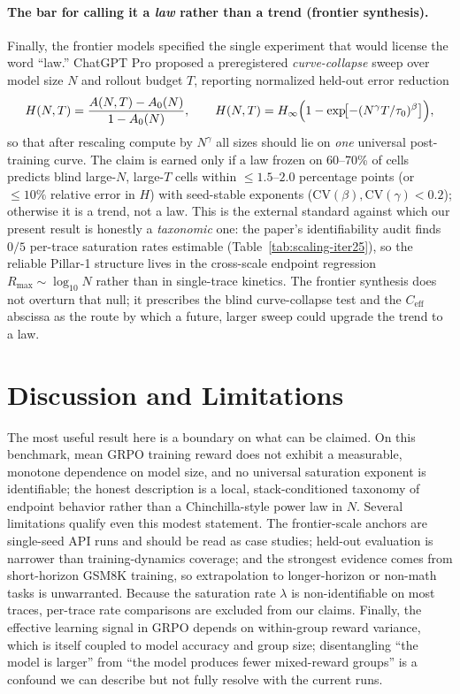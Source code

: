 \documentclass{article}
\providecommand{\tableref}[1]{Table~\ref{#1}}
\begin{document}
\paragraph{The bar for calling it a \emph{law} rather than a trend (frontier synthesis).}
Finally, the frontier models specified the single experiment that would
license the word ``law.'' ChatGPT Pro proposed a preregistered
\emph{curve-collapse} sweep over model size $N$ and rollout budget $T$,
reporting normalized held-out error reduction
\begin{equation}
  \label{eq:frontier-collapse}
  H(N,T) = \frac{A(N,T) - A_0(N)}{1 - A_0(N)},
  \qquad
  H(N,T) = H_\infty\Bigl(1 - \exp\!\bigl[-(N^{\gamma} T / \tau_0)^{\beta}\bigr]\Bigr),
\end{equation}
so that after rescaling compute by $N^{\gamma}$ all sizes should lie on
\emph{one} universal post-training curve. The claim is earned only if a law
frozen on 60--70\% of cells predicts blind large-$N$, large-$T$ cells within
$\le 1.5$--$2.0$ percentage points (or $\le 10\%$ relative error in $H$) with
seed-stable exponents ($\mathrm{CV}(\beta),\mathrm{CV}(\gamma)<0.2$);
otherwise it is a trend, not a law. This is the external standard against
which our present result is honestly a \emph{taxonomic} one: the paper's
identifiability audit finds $0/5$ per-trace saturation rates estimable
(\tableref{tab:scaling-iter25}), so the reliable Pillar-1 structure lives in
the cross-scale endpoint regression $R_{\max}\sim\log_{10}N$ rather than in
single-trace kinetics. The frontier synthesis does not overturn that null; it
prescribes the blind curve-collapse test and the $C_{\mathrm{eff}}$ abscissa
as the route by which a future, larger sweep could upgrade the trend to a law.
 \section{Discussion and Limitations}
\label{sec:p1-discussion}
The most useful result here is a boundary on what can be claimed. On this
benchmark, mean GRPO training reward does not exhibit a measurable, monotone dependence
on model size, and no universal saturation exponent is identifiable; the honest
description is a local, stack-conditioned taxonomy of endpoint behavior rather than a
Chinchilla-style power law in $N$. Several limitations qualify even this modest
statement. The frontier-scale anchors are single-seed API runs and should be read
as case studies; held-out evaluation is narrower than training-dynamics coverage;
and the strongest evidence comes from short-horizon GSM8K training, so extrapolation
to longer-horizon or non-math tasks is unwarranted. Because the saturation rate
$\lambda$ is non-identifiable on most traces, per-trace rate comparisons are
excluded from our claims. Finally, the effective learning signal in GRPO depends
on within-group reward variance, which is itself coupled to model accuracy and
group size; disentangling ``the model is larger'' from ``the model produces fewer
mixed-reward groups'' is a confound we can describe but not fully resolve with the
current runs.
\end{document}
